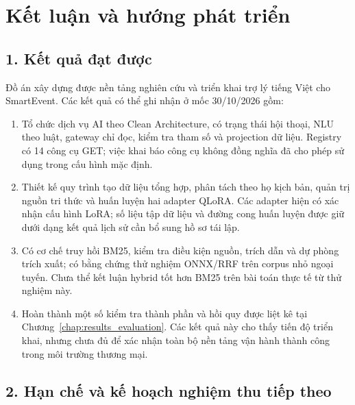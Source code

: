 \chapter*{Kết luận và hướng phát triển}
{}

\section*{1. Kết quả đạt được}
{}

Đồ án xây dựng được nền tảng nghiên cứu và triển khai trợ lý tiếng Việt cho SmartEvent. Các kết quả có thể ghi nhận ở mốc 30/10/2026 gồm:
\begin{enumerate}[nosep]
  \item Tổ chức dịch vụ AI theo Clean Architecture, có trạng thái hội thoại, NLU theo luật, gateway chỉ đọc, kiểm tra tham số và projection dữ liệu. Registry có 14 công cụ GET; việc khai báo công cụ không đồng nghĩa đã cho phép sử dụng trong cấu hình mặc định.
  \item Thiết kế quy trình tạo dữ liệu tổng hợp, phân tách theo họ kịch bản, quản trị nguồn tri thức và huấn luyện hai adapter QLoRA. Các adapter hiện có xác nhận cấu hình LoRA; số liệu tập dữ liệu và đường cong huấn luyện được giữ dưới dạng kết quả lịch sử cần bổ sung hồ sơ tái lập.
  \item Có cơ chế truy hồi BM25, kiểm tra điều kiện nguồn, trích dẫn và dự phòng trích xuất; có bằng chứng thử nghiệm ONNX/RRF trên corpus nhỏ ngoại tuyến. Chưa thể kết luận hybrid tốt hơn BM25 trên bài toán thực tế từ thử nghiệm này.
  \item Hoàn thành một số kiểm tra thành phần và hồi quy được liệt kê tại Chương~\ref{chap:results_evaluation}. Các kết quả này cho thấy tiến độ triển khai, nhưng chưa đủ để xác nhận toàn bộ nền tảng vận hành thành công trong môi trường thương mại.
\end{enumerate}

\section*{2. Hạn chế và kế hoạch nghiệm thu tiếp theo}
{}


